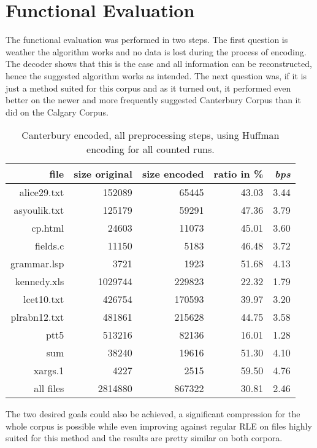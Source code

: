 \section{Functional Evaluation}
\label{ch:Evaluation:sec:Functional Evaluation}
\par{
The functional evaluation was performed in two steps. The first question is weather the algorithm works and no data is lost during the process of encoding. The decoder shows that this is the case and all information can be reconstructed, hence the suggested algorithm works as intended. The next question was, if it is just a method suited for this corpus and as it turned out, it performed even better on the newer and more frequently suggested Canterbury Corpus than it did on the Calgary Corpus.
}
	\begin{table}[h]
	\centering
	\begin{tabular}{r|r|r|r|r}	
		file & size original & size encoded & ratio in \% & \textit{bps}\\
		\hline
alice29.txt & 152089 & 65445 & 43.03 & 3.44 \\
asyoulik.txt & 125179 & 59291 & 47.36 & 3.79 \\
cp.html & 24603 & 11073 & 45.01 & 3.60 \\
fields.c & 11150 & 5183 & 46.48 & 3.72 \\
grammar.lsp & 3721 & 1923 & 51.68 & 4.13 \\
kennedy.xls & 1029744 & 229823 & 22.32 & 1.79 \\
lcet10.txt & 426754 & 170593 & 39.97 & 3.20 \\
plrabn12.txt & 481861 & 215628 & 44.75 & 3.58 \\
ptt5 & 513216 & 82136 & 16.01 & 1.28 \\
sum & 38240 & 19616 & 51.30 & 4.10 \\
xargs.1 & 4227 & 2515 & 59.50 & 4.76 \\
		\hline
		all files & 2814880 & 867322 & 30.81 & 2.46
	\end{tabular}
	\caption{Canterbury encoded, all preprocessing steps, using Huffman encoding for all counted runs.}
	\label{tab:t100:Canterbury encoded, all preprocessing steps, using Huffman encoding for all counted runs}
\end{table}
\par{
	The two desired goals could also be achieved, a significant compression for the whole corpus is possible while even improving against regular RLE on files highly suited for this method and the results are pretty similar on both corpora.
}


